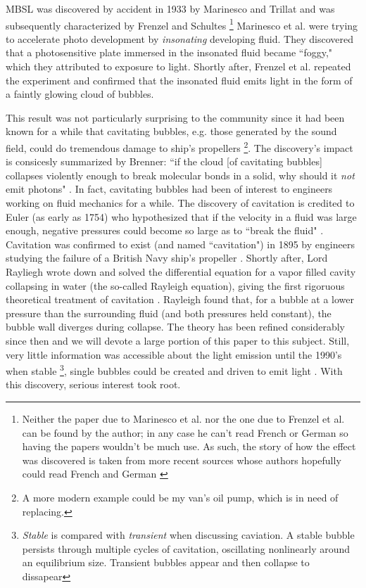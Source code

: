 \documentclass[rmp,aps,nofootinbib,superscriptaddress,floatfix]{revtex4-2}
\begin{document}
MBSL was discovered by accident in 1933 by Marinesco and Trillat \cite{marinesco1933actions} and was subsequently characterized by Frenzel and Schultes \cite{frenzel1934luminescenz} \footnote{Neither the paper due to Marinesco et al. nor the one due to Frenzel et al. can be found by the author; in any case he can't read French or German so having the papers wouldn't be much use. As such, the story of how the effect was discovered is taken from more recent sources whose authors hopefully could read French and German \cite{brenner2002single,gaitan1990experimental,crum1994sonoluminescence}} Marinesco et al. were trying to accelerate photo development by \emph{insonating} developing fluid. They discovered that a photosensitive plate immersed in the insonated fluid became ``foggy," which they attributed to exposure to light. Shortly after, Frenzel et al. repeated the experiment and confirmed that the insonated fluid emits light in the form of a faintly glowing cloud of bubbles. 

This result was not particularly surprising to the community since it had been known for a while that cavitating bubbles, e.g. those generated by the sound field, could do tremendous damage to ship's propellers \footnote{A more modern example could be my van's oil pump, which is in need of replacing.}. The discovery's impact is consicesly summarized by Brenner: ``if the cloud [of cavitating bubbles] collapses violently enough to break molecular bonds in a solid, why should it \emph{not} emit photons" \cite{brenner2002single}. In fact, cavitating bubbles had been of interest to engineers working on fluid mechanics for a while. The discovery of cavitation is credited to Euler (as early as 1754) who hypothesized that if the velocity in a fluid was large enough, negative pressures could become so large as to ``break the fluid" \cite{li2015introduction,gaitan1992sonoluminescence}. Cavitation was confirmed to exist (and named ``cavitation") in 1895 by engineers studying the failure of a British Navy ship's propeller \cite{li2015introduction}. Shortly after, Lord Rayliegh wrote down and solved the differential equation for a vapor filled cavity collapsing in water (the so-called Rayleigh equation), giving the first rigoruous theoretical treatment of cavitation \cite{rayleigh1917pressure,plesset1977bubble}. Rayleigh found that, for a bubble at a lower pressure than the surrounding fluid (and both pressures held constant), the bubble wall diverges during collapse. The theory has been refined considerably since then \cite{prosperetti1999old,plesset1977bubble,plesset1977bubble,brenner2002single,lofstedt1995sonoluminescing,barber1992resolving} and we will devote a large portion of this paper to this subject. Still, very little information was accessible about the light emission until the 1990's when stable \footnote{\emph{Stable} is compared with \emph{transient} when discussing caviation. A stable bubble persists through multiple cycles of cavitation, oscillating nonlinearly around an equilibrium size. Transient bubbles appear and then collapse to dissapear}, single bubbles could be created and driven to emit light \cite{gaitan1990experimental,gaitan1992sonoluminescence,crum1994sonoluminescence}. With this discovery, serious interest took root. 
\end{document}
